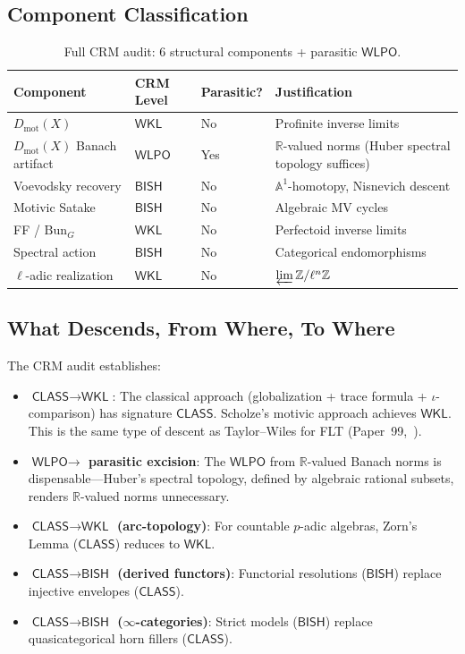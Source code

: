\documentclass[11pt,a4paper]{article}
\theoremstyle{plain}
\theoremstyle{definition}
\newcommand{\BISH}{\textsf{BISH}}
\newcommand{\WKL}{\textsf{WKL}}
\newcommand{\WLPO}{\textsf{WLPO}}
\newcommand{\CLASS}{\textsf{CLASS}}
\newcommand{\Dmot}{D_{\mathrm{mot}}}
\newcommand{\Bun}{\mathrm{Bun}}
\newcommand{\Z}{\mathbb{Z}}
\newcommand{\R}{\mathbb{R}}
\newcommand{\A}{\mathbb{A}}
\begin{document}
\subsection{Component Classification}

\begin{table}[ht]
\centering
\begin{tabular}{@{}llll@{}}
\toprule
\textbf{Component} & \textbf{CRM Level} & \textbf{Parasitic?} & \textbf{Justification} \\
\midrule
$\Dmot(X)$ & $\WKL$ & No & Profinite inverse limits \\
$\Dmot(X)$ Banach artifact & $\WLPO$ & Yes & $\R$-valued norms (Huber spectral topology suffices) \\
Voevodsky recovery & $\BISH$ & No & $\A^1$-homotopy, Nisnevich descent \\
Motivic Satake & $\BISH$ & No & Algebraic MV cycles \\
FF / $\Bun_G$ & $\WKL$ & No & Perfectoid inverse limits \\
Spectral action & $\BISH$ & No & Categorical endomorphisms \\
$\ell$-adic realization & $\WKL$ & No & $\varprojlim \Z/\ell^n\Z$ \\
\bottomrule
\end{tabular}
\caption{Full CRM audit: 6 structural components + parasitic $\WLPO$.}
\label{tab:audit-full}
\end{table}

\subsection{What Descends, From Where, To Where}

The CRM audit establishes:
\begin{itemize}
\item \textbf{$\CLASS \to \WKL$}: The classical approach (globalization + trace formula + $\iota$-comparison) has signature $\CLASS$. Scholze's motivic approach achieves $\WKL$. This is the same type of descent as Taylor--Wiles for FLT (Paper~99,~\cite{lee-p99}).
\item \textbf{$\WLPO \to$ parasitic excision}: The $\WLPO$ from $\R$-valued Banach norms is dispensable---Huber's spectral topology, defined by algebraic rational subsets, renders $\R$-valued norms unnecessary.
\item \textbf{$\CLASS \to \WKL$ (arc-topology)}: For countable $p$-adic algebras, Zorn's Lemma ($\CLASS$) reduces to $\WKL$.
\item \textbf{$\CLASS \to \BISH$ (derived functors)}: Functorial resolutions ($\BISH$) replace injective envelopes ($\CLASS$).
\item \textbf{$\CLASS \to \BISH$ ($\infty$-categories)}: Strict models ($\BISH$) replace quasicategorical horn fillers ($\CLASS$).
\end{itemize}
\end{document}
